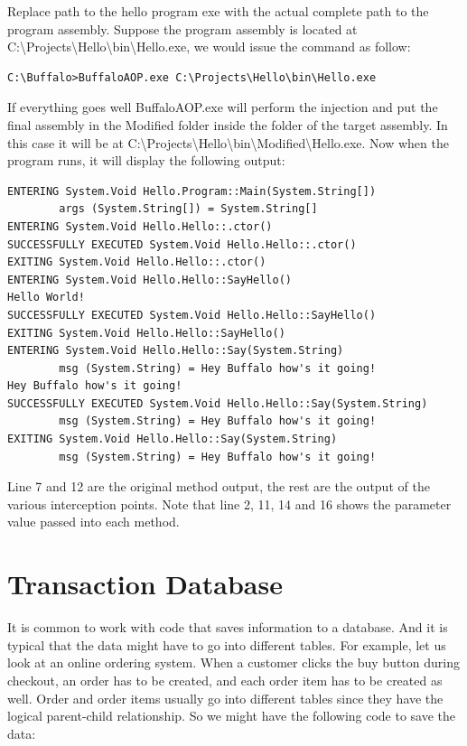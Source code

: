 Replace path to the hello program exe with the actual complete path to the program assembly. Suppose the program assembly is located at C:\textbackslash{Projects}\textbackslash{Hello}\textbackslash{bin}\textbackslash{Hello.exe}, we would issue the command as follow:

\begin{lstlisting}[caption={Invoking BuffaloAOP.exe Example}, label=buffalocmd2, frame=tb, basicstyle=\scriptsize]
C:\Buffalo>BuffaloAOP.exe C:\Projects\Hello\bin\Hello.exe
\end{lstlisting}

If everything goes well BuffaloAOP.exe will perform the injection and put the final assembly in the Modified folder inside the folder of the target assembly. In this case it will be at C:\textbackslash{Projects}\textbackslash{Hello}\textbackslash{bin}\textbackslash{Modified}\textbackslash{Hello.exe}. Now when the program runs, it will display the following output:

\begin{lstlisting}[caption={TraceAspect output}, label=traceaspectout, frame=tb, basicstyle=\scriptsize]
ENTERING System.Void Hello.Program::Main(System.String[])
        args (System.String[]) = System.String[]
ENTERING System.Void Hello.Hello::.ctor()
SUCCESSFULLY EXECUTED System.Void Hello.Hello::.ctor()
EXITING System.Void Hello.Hello::.ctor()
ENTERING System.Void Hello.Hello::SayHello()
Hello World!
SUCCESSFULLY EXECUTED System.Void Hello.Hello::SayHello()
EXITING System.Void Hello.Hello::SayHello()
ENTERING System.Void Hello.Hello::Say(System.String)
        msg (System.String) = Hey Buffalo how's it going!
Hey Buffalo how's it going!
SUCCESSFULLY EXECUTED System.Void Hello.Hello::Say(System.String)
        msg (System.String) = Hey Buffalo how's it going!
EXITING System.Void Hello.Hello::Say(System.String)
        msg (System.String) = Hey Buffalo how's it going!
\end{lstlisting}

Line 7 and 12 are the original method output, the rest are the output of the various interception points. Note that line 2, 11, 14 and 16 shows the parameter value passed into each method.

\section{Transaction Database}

It is common to work with code that saves information to a database. And it is typical that the data might have to go into different tables. For example, let us look at an online ordering system. When a customer clicks the buy button during checkout, an order has to be created, and each order item has to be created as well. Order and order items usually go into different tables since they have the logical parent-child relationship. So we might have the following code to save the data:

